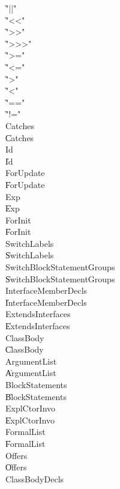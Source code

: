 {\begin{grammar}

    \| \xcd"||"\\
    \| \xcd"<<"\\
    \| \xcd">>"\\
    \| \xcd">>>"\\
    \| \xcd">="\\
    \| \xcd"<="\\
    \| \xcd">"\\
    \| \xcd"<"\\
    \| \xcd"=="\\
    \| \xcd"!="\\
 Catches\opt  \: \\
    \| Catches\\
 Id\opt  \: \\
    \| Id\\
 ForUpdate\opt  \: \\
    \| ForUpdate\\
 Exp\opt  \: \\
    \| Exp\\
 ForInit\opt  \: \\
    \| ForInit\\
 SwitchLabels\opt  \: \\
    \| SwitchLabels\\
 SwitchBlockStatementGroups\opt  \: \\
    \| SwitchBlockStatementGroups\\
 InterfaceMemberDecls\opt  \: \\
    \| InterfaceMemberDecls\\
 ExtendsInterfaces\opt  \: \\
    \| ExtendsInterfaces\\
 ClassBody\opt  \: \\
    \| ClassBody\\
 ArgumentList\opt  \: \\
    \| ArgumentList\\
 BlockStatements\opt  \: \\
    \| BlockStatements\\
 ExplCtorInvo\opt  \: \\
    \| ExplCtorInvo\\
 FormalList\opt  \: \\
    \| FormalList\\
 Offers\opt  \: \\
    \| Offers\\
 ClassBodyDecls\opt  \: \\
\end{grammar}

}
